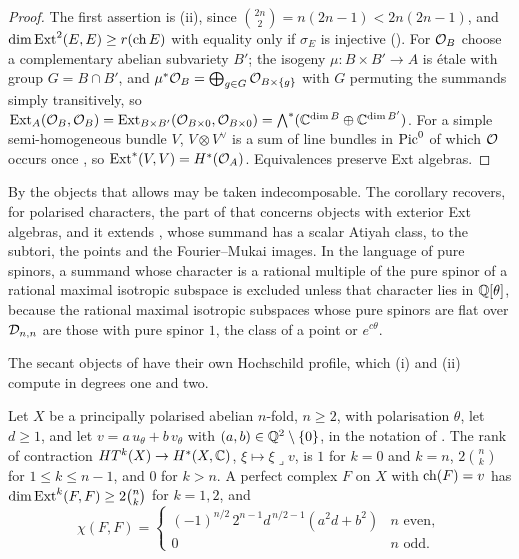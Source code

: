 \begin{proof}
The first assertion is (ii), since
$\binom{2n}{2}=n(2n-1)<2n(2n-1)$, and $\dim\operatorname{Ext}^{2}(E,E)\ge r(\operatorname{ch} E)$ with
equality only if $\sigma_{E}$ is injective (). For
$\mathcal{O}_{B}$ choose a complementary abelian subvariety $B'$; the isogeny
$\mu\colon B\times B'\to A$ is \'etale with group $G=B\cap B'$, and
$\mu^{*}\mathcal{O}_{B}=\bigoplus_{g\in G}\mathcal{O}_{B\times\{g\}}$ with $G$ permuting the
summands simply transitively, so $\operatorname{Ext}_{A}(\mathcal{O}_{B},\mathcal{O}_{B})
=\operatorname{Ext}_{B\times B'}(\mathcal{O}_{B\times0},\mathcal{O}_{B\times0})=\bigwedge^{*}(\mathbb{C}^{\dim B}
\oplus\mathbb{C}^{\dim B'})$. For a simple semi-homogeneous bundle $V$,
$V\otimes V^{\vee}$ is a sum of line bundles in $\operatorname{Pic}^{0}$ of which $\mathcal{O}$ occurs
once \cite{Muk78}, so $\operatorname{Ext}^{*}(V,V)=H^{*}(\mathcal{O}_{A})$. Equivalences preserve
Ext algebras.
\end{proof}

By  the objects that 
allows may be taken indecomposable. The corollary recovers, for
polarised characters, the part of \cite[Theorem~2.32]{paperIII} that concerns objects with
exterior Ext algebras, and it extends , whose summand
has a scalar Atiyah class, to the subtori, the points and the Fourier--Mukai
images. In the language of pure spinors, a summand whose
character is a rational multiple of the pure spinor of a rational maximal
isotropic subspace is excluded unless that character lies in $\mathbb{Q}[\theta]$,
because the rational maximal isotropic subspaces whose pure spinors are flat
over $\mathcal{D}_{n,n}$ are those with pure spinor $1$, the class of a point or
$e^{c\theta}$.

The secant objects of \cite[Section~14]{paperI} have their own Hochschild
profile, which (i) and (ii) compute in degrees one and two.

\begin{proposition}
\label{prop:secantprofile}
Let $X$ be a principally polarised abelian $n$-fold, $n\ge2$, with
polarisation $\theta$, let $d\ge1$, and let $v=a\,u_{\theta}+b\,v_{\theta}$
with $(a,b)\in\mathbb{Q}^{2}\setminus\{0\}$, in the notation of \cite[(30)]{paperI}. The
rank of contraction $HT^{k}(X)\to H^{*}(X,\mathbb{C})$, $\xi\mapsto\xi\lrcorner v$, is
$1$ for $k=0$ and $k=n$, $2\binom{n}{k}$ for $1\le k\le n-1$, and $0$ for
$k>n$. A perfect complex $F$ on $X$ with $\operatorname{ch}(F)=v$ has
$\dim\operatorname{Ext}^{k}(F,F)\ge2\binom{n}{k}$ for $k=1,2$, and
\[
  \chi(F,F)=\begin{cases}
    (-1)^{n/2}\,2^{n-1}d^{\,n/2-1}(a^{2}d+b^{2}) & n\text{ even},\\
    0 & n\text{ odd}.
  \end{cases}
\]
\end{proposition}

